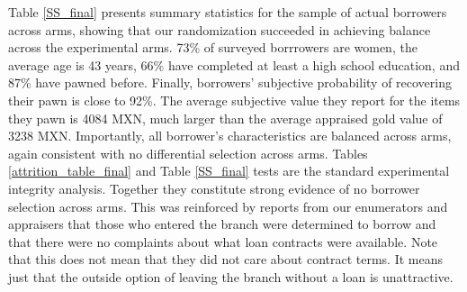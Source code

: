 \documentclass[12pt, a4paper]{article}
\begin{document}
Table \ref{SS_final} presents summary statistics for the sample of actual borrowers across arms, showing that our randomization succeeded in achieving balance across the experimental arms. %
73\% of surveyed borrrowers are women, the average age is 43 years, 66\% have completed at least a high school education, and 87\% have pawned before. Finally, borrowers' subjective probability of recovering their pawn is close to 92\%. The average subjective value they report for the items they pawn is 4084 MXN, much larger than the average appraised gold value of 3238 MXN. %
Importantly, all borrower's characteristics are balanced across arms, again consistent with no differential selection across arms. Tables \ref{attrition_table_final} and Table \ref{SS_final}  tests are the standard experimental integrity analysis. Together they constitute strong evidence of no borrower selection across arms. This was reinforced by reports from our enumerators and appraisers that those who entered the branch were determined to borrow and that there were no complaints about what loan contracts were available. Note that this does not mean that they did not care about contract terms. It means just that the outside option of leaving the branch without a loan is unattractive.
\end{document}
